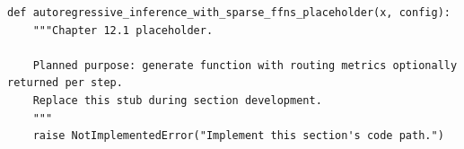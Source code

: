 \begin{lstlisting}[style=bookpython,caption={Planned code placeholder for autoregressive inference with sparse FFNs.},label={lst:ch12-autoregressive-inference-with-sparse-ffns}]
def autoregressive_inference_with_sparse_ffns_placeholder(x, config):
    """Chapter 12.1 placeholder.

    Planned purpose: generate function with routing metrics optionally returned per step.
    Replace this stub during section development.
    """
    raise NotImplementedError("Implement this section's code path.")
\end{lstlisting}

